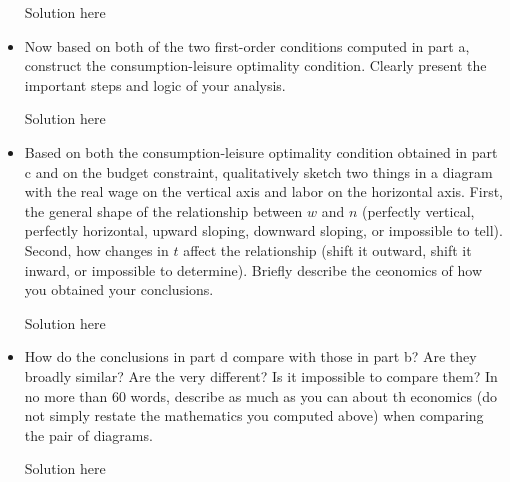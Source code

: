 \documentclass[11pt]{SelfArxOneColBMN}
\begin{document}
\begin{exercise}
\begin{itemize}
\begin{solution}
			Solution here
		\end{solution}
		\item Now based on both of the two first-order conditions computed in part a, construct the consumption-leisure optimality condition. Clearly present the important steps and logic of your analysis.
		\begin{solution}
			Solution here
		\end{solution}
		\item Based on both the consumption-leisure optimality condition obtained in part c and on the budget constraint, qualitatively sketch two things in a diagram with the real wage on the vertical axis and labor on the horizontal axis. First, the general shape of the relationship between $w$ and $n$ (perfectly vertical, perfectly horizontal, upward sloping, downward sloping, or impossible to tell). Second, how changes in $t$ affect the relationship (shift it outward, shift it inward, or impossible to determine). Briefly describe the ceonomics of how you obtained your conclusions.
		\begin{solution}
			Solution here
		\end{solution}
		\item How do the conclusions in part d compare with those in part b? Are they broadly similar? Are the very different? Is it impossible to compare them? In no more than 60 words, describe as much as you can about th economics (do not simply restate the mathematics you computed above) when comparing the pair of diagrams.
		\begin{solution}
			Solution here
		\end{solution}
	\end{itemize}
\end{exercise}
\end{document}
